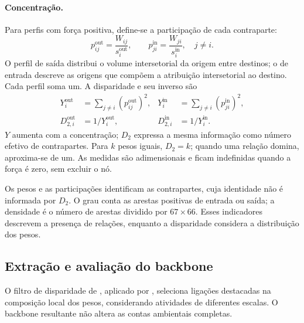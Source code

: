 \documentclass[12pt]{article}
\begin{document}
\paragraph{Concentração.}
Para perfis com força positiva, define-se a participação de cada contraparte:
\begin{equation}
p_{ij}^{\mathrm{out}}=\frac{W_{ij}}{s_i^{\mathrm{out}}},\qquad
p_{ji}^{\mathrm{in}}=\frac{W_{ji}}{s_i^{\mathrm{in}}},\quad j\ne i.
\label{eq:participacoes-externas}
\end{equation}
O perfil de saída distribui o volume intersetorial da origem entre destinos; o de entrada descreve as origens que compõem a atribuição intersetorial ao destino. Cada perfil soma um. A disparidade e seu inverso são
\begin{equation}
\begin{aligned}
Y_i^{\mathrm{out}}&=\sum_{j\ne i}(p_{ij}^{\mathrm{out}})^2,&
Y_i^{\mathrm{in}}&=\sum_{j\ne i}(p_{ji}^{\mathrm{in}})^2,\\
D_{2,i}^{\mathrm{out}}&=1/Y_i^{\mathrm{out}},&
D_{2,i}^{\mathrm{in}}&=1/Y_i^{\mathrm{in}}.
\end{aligned}
\label{eq:disparidade}
\end{equation}
$Y$ aumenta com a concentração; $D_2$ expressa a mesma informação como número efetivo de contrapartes. Para $k$ pesos iguais, $D_2=k$; quando uma relação domina, aproxima-se de um. As medidas são adimensionais e ficam indefinidas quando a força é zero, sem excluir o nó.

Os pesos e as participações identificam as contrapartes, cuja identidade não é informada por $D_2$. O grau conta as arestas positivas de entrada ou saída; a densidade é o número de arestas dividido por $67\times66$. Esses indicadores descrevem a presença de relações, enquanto a disparidade considera a distribuição dos pesos.

\subsection{Extração e avaliação do backbone}
\label{sec:backbone}

O filtro de disparidade de \textcite{serrano2009}, aplicado por \textcite{huang2019}, seleciona ligações destacadas na composição local dos pesos, considerando atividades de diferentes escalas. O backbone resultante não altera as contas ambientais completas.
\end{document}
